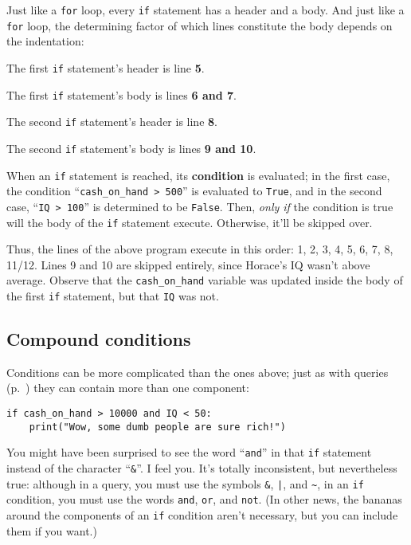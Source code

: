 Just like a \texttt{for} loop, every \texttt{if} statement has a header and a
body. And just like a \texttt{for} loop, the determining factor of which lines
constitute the body depends on the indentation:

\begin{compactitem}
\item[\leftpointright] The first \texttt{if} statement's header is line \textbf{5}.
\item[\leftpointright] The first \texttt{if} statement's body is lines \textbf{6 and 7}.
\item[\leftpointright] The second \texttt{if} statement's header is line \textbf{8}.
\item[\leftpointright] The second \texttt{if} statement's body is lines
\textbf{9 and 10}.
\end{compactitem}


When an \texttt{if} statement is reached, its \textbf{condition} is evaluated;
in the first case, the condition ``\texttt{cash\_on\_hand > 500}'' is evaluated
to \texttt{True}, and in the second case, ``\texttt{IQ > 100}'' is determined
to be \texttt{False}. Then, \textit{only if} the condition is true will the
body of the \texttt{if} statement execute. Otherwise, it'll be skipped over.

Thus, the lines of the above program execute in this order: 1, 2, 3, 4, 5, 6,
7, 8, 11/12. Lines 9 and 10 are skipped entirely, since Horace's IQ wasn't above
average. Observe that the \texttt{cash\_on\_hand} variable was updated inside
the body of the first \texttt{if} statement, but that \texttt{IQ} was not.

\subsection{Compound conditions}


Conditions can be more complicated than the ones above; just as with queries
(p.~\pageref{seriesCompoundQueries}) they can contain more than one component:

\begin{Verbatim}[fontsize=\small,samepage=true,frame=single,framesep=3mm]
if cash_on_hand > 10000 and IQ < 50:
    print("Wow, some dumb people are sure rich!")
\end{Verbatim}


You might have been surprised to see the word ``\texttt{and}'' in that
\texttt{if} statement instead of the character ``\texttt{\&}''. I feel you.
It's totally inconsistent, but nevertheless true: although in a query, you must
use the symbols \texttt{\&}, \texttt{|}, and \texttt{\textasciitilde}, in an
\texttt{if} condition, you must use the words \texttt{and}, \texttt{or}, and
\texttt{not}. (In other news, the bananas around the components of an
\texttt{if} condition aren't necessary, but you can include them if you want.)

